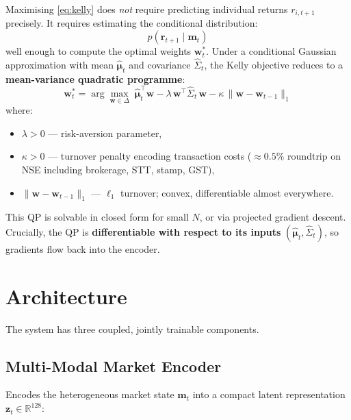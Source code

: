 \documentclass[11pt, a4paper]{article}
\begin{document}
Maximising \eqref{eq:kelly} does \emph{not} require predicting individual
returns $r_{i,t+1}$ precisely.  It requires estimating the conditional
distribution:
\[
  p\!\left(\mathbf{r}_{t+1} \mid \mathbf{m}_t\right)
\]
well enough to compute the optimal weights $\mathbf{w}_t^*$.  Under a
conditional Gaussian approximation with mean $\hat{\boldsymbol{\mu}}_t$ and
covariance $\hat{\Sigma}_t$, the Kelly objective reduces to a
\textbf{mean-variance quadratic programme}:
\begin{equation}\label{eq:qp}
  \mathbf{w}_t^* = \arg\max_{\mathbf{w} \in \Delta}\;
    \hat{\boldsymbol{\mu}}_t^\top \mathbf{w}
    - \lambda\, \mathbf{w}^\top \hat{\Sigma}_t\, \mathbf{w}
    - \kappa\, \|\mathbf{w} - \mathbf{w}_{t-1}\|_1
\end{equation}
where:
\begin{itemize}[noitemsep]
  \item $\lambda > 0$ — risk-aversion parameter,
  \item $\kappa > 0$ — turnover penalty encoding transaction costs
        ($\approx 0.5\%$ roundtrip on NSE including brokerage, STT, stamp, GST),
  \item $\|\mathbf{w} - \mathbf{w}_{t-1}\|_1$ — $\ell_1$ turnover; convex,
        differentiable almost everywhere.
\end{itemize}

This QP is solvable in closed form for small $N$, or via projected gradient
descent.  Crucially, the QP is \textbf{differentiable with respect to its
inputs} $(\hat{\boldsymbol{\mu}}_t, \hat{\Sigma}_t)$, so gradients flow back
into the encoder.

\section{Architecture}

The system has three coupled, jointly trainable components.

\subsection{Multi-Modal Market Encoder}

Encodes the heterogeneous market state $\mathbf{m}_t$ into a compact latent
representation $\mathbf{z}_t \in \mathbb{R}^{128}$:
\end{document}
